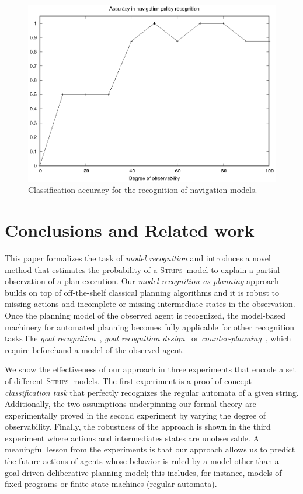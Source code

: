 \documentclass[letterpaper]{article} %
\newcommand{\strips}{\textsc{Strips}}     %
\begin{document}
\begin{figure}
	\centering
	\includegraphics[width=0.9\linewidth]{figures/navigation.eps}
	\caption{Classification accuracy for the recognition of navigation models.}
	\label{fig:navigation_acc}
\end{figure}



\section{Conclusions and Related work}
\label{sec:related}


This paper formalizes the task of {\em model recognition} and introduces a novel method that estimates the probability of a \strips\ model to explain a partial observation of a plan execution. Our {\em model recognition as planning} approach builds on top of off-the-shelf classical planning algorithms and it is robust to missing actions and incomplete or missing intermediate states in the observation. Once the planning model of the observed agent is recognized, the model-based machinery for automated planning becomes fully applicable for other recognition tasks like {\em goal recognition}~\cite{ramirez2012plan}, {\em goal recognition design}~\cite{KerenGK14} or {\em counter-planning}~\cite{PozancoEFB18}, which require beforehand a model of the observed agent.

We show the effectiveness of our approach in three experiments that encode a set of different \strips\ models. 
The first experiment is a proof-of-concept \emph{classification task} that perfectly recognizes the regular automata of a given string. Additionally, the two assumptions underpinning our formal theory are experimentally proved in the second experiment by varying the degree of observability. Finally, the robustness of the approach is shown in the third experiment where actions and intermediates states are unobservable. A meaningful lesson from the experiments is that our approach allows us to predict the future actions of agents whose behavior is ruled by a model other than a goal-driven deliberative planning model; this includes, for instance, models of fixed programs or finite state machines (regular automata).
\end{document}
